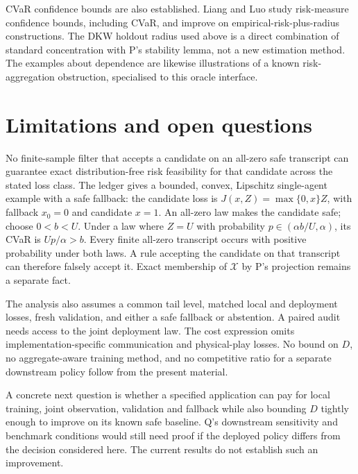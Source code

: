 \documentclass{article}
\begin{document}
CVaR confidence bounds are also established.  Liang and Luo
\cite{LiangLuo} study risk-measure confidence bounds, including CVaR,
and improve on empirical-risk-plus-radius constructions.  The DKW
holdout radius used above is a direct combination of standard
concentration with P's stability lemma, not a new estimation method.
The examples about dependence are likewise illustrations of a known
risk-aggregation obstruction, specialised to this oracle interface.

\section{Limitations and open questions}

No finite-sample filter that accepts a candidate on an all-zero safe
transcript can guarantee exact distribution-free risk feasibility for
that candidate across the stated loss class.  The ledger gives a bounded,
convex, Lipschitz single-agent example with a safe fallback: the
candidate loss is \(J(x,Z)=\max\{0,x\}Z\), with fallback \(x_0=0\)
and candidate \(x=1\).  An all-zero law makes the candidate safe;
choose \(0<b<U\). Under a law where \(Z=U\) with probability
\(p\in(\alpha b/U,\alpha)\), its CVaR is \(Up/\alpha>b\).
Every finite all-zero transcript occurs with positive probability
under both laws.  A rule accepting the candidate on that transcript
can therefore falsely accept it.  Exact membership of
\(\mathcal X\) by P's projection remains a separate fact.

The analysis also assumes a common tail level, matched local and
deployment losses, fresh validation, and either a safe fallback or
abstention.  A paired audit needs access to the joint deployment law.
The cost expression omits implementation-specific communication and
physical-play losses.  No bound on \(D\), no aggregate-aware training
method, and no competitive ratio for a separate downstream policy
follow from the present material.

A concrete next question is whether a specified application can pay
for local training, joint observation, validation and fallback while
also bounding \(D\) tightly enough to improve on its known safe
baseline.  Q's downstream sensitivity and benchmark conditions would
still need proof if the deployed policy differs from the decision
considered here.  The current results do not establish such an
improvement.



\end{document}
